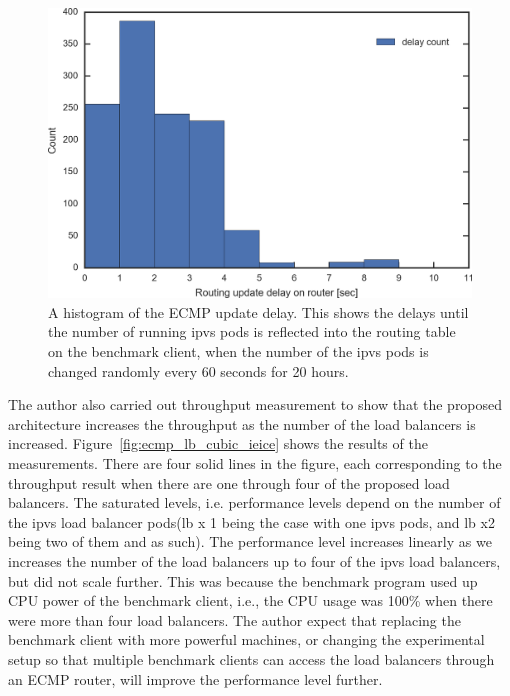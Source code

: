 \begin{figure}[h]
  \includegraphics[width=0.9\columnwidth,left]{Figs/ecmp_delay_histgram_ieice}
  \centering
  \begin{minipage}{0.9\columnwidth}
    \caption[A histogram of the ECMP update delay]{
      A histogram of the ECMP update delay.
      This shows the delays until the number of running ipvs pods is reflected into the routing table on the benchmark client,
    when the number of the ipvs pods is changed randomly every 60 seconds for 20 hours.
    }
  \end{minipage}
  \label{fig:ecmp_delay_histgram_ieice}
\end{figure}

The author also carried out throughput measurement to show that the proposed architecture increases the throughput as the number of the load balancers is increased.
Figure~\ref{fig:ecmp_lb_cubic_ieice} shows the results of the measurements.
There are four solid lines in the figure, each corresponding to the throughput result when there are one through four of the proposed load balancers.
The saturated levels, i.e. performance levels depend on the number of the ipvs load balancer pods(lb x 1 being the case with one ipvs pods, and lb x2 being two of them and as such). The performance level increases linearly as we increases the number of the load balancers up to four of the ipvs load balancers, but did not scale further.
This was because the benchmark program used up CPU power of the benchmark client, i.e., the CPU usage was 100\% when there were more than four load balancers.
The author expect that replacing the benchmark client with more powerful machines, or changing the experimental setup so that multiple benchmark clients can access the load balancers through an ECMP router, will improve the performance level further.

